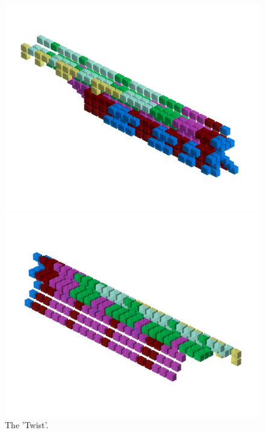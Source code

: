\begin{figure}[H]
    \centering
    \begin{adjustbox}{width=12cm,center}
      \includegraphics[width=12cm]{src/patterns/pattern1-45.png}%
    \end{adjustbox}
    \begin{adjustbox}{width=12cm,margin=0cm -4cm}
      \includegraphics[width=12cm]{src/patterns/pattern1-225.png}%
    \end{adjustbox}
\caption{The 'Twist'.}
\end{figure}
\clearpage

